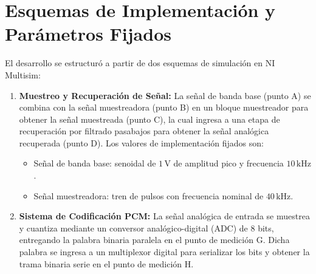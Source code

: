 \section{Esquemas de Implementación y Parámetros Fijados}
El desarrollo se estructuró a partir de dos esquemas de simulación en NI Multisim:
\begin{enumerate}
    \item \textbf{Muestreo y Recuperación de Señal:} La señal de banda base (punto A) se combina con la señal
          muestreadora (punto B) en un bloque muestreador para obtener la señal muestreada (punto C), la cual ingresa a
          una etapa de recuperación por filtrado pasabajos para obtener la señal analógica recuperada (punto D).
          Los valores de implementación fijados son:
          \begin{itemize}
              \item Señal de banda base: senoidal de $1\,\unit{\volt}$ de amplitud pico y frecuencia $10\,\unit{\kilo\hertz}$.
              \item Señal muestreadora: tren de pulsos con frecuencia nominal de $40\,\unit{\kilo\hertz}$.
          \end{itemize}
    \item \textbf{Sistema de Codificación PCM:} La señal analógica de entrada se muestrea y cuantiza mediante un
          conversor analógico-digital (ADC) de 8 bits, entregando la palabra binaria paralela en el punto de medición G.
          Dicha palabra se ingresa a un multiplexor digital para serializar los bits y obtener la trama binaria serie
          en el punto de medición H.
\end{enumerate}
